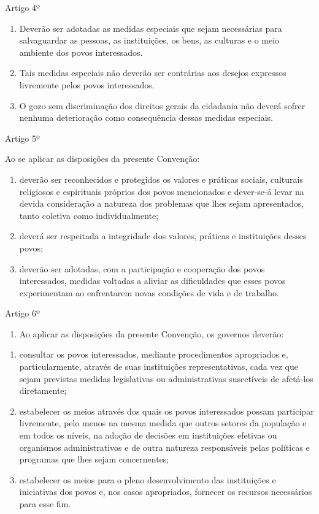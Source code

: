 \documentclass[
]{book}
\providecommand{\tightlist}{%
  \setlength{\itemsep}{0pt}\setlength{\parskip}{0pt}}
\begin{document}
Artigo 4º

\begin{enumerate}
\def\labelenumi{\arabic{enumi}.}
\item
  Deverão ser adotadas as medidas especiais que sejam necessárias para salvaguardar as pessoas, as instituições, os bens, as culturas e o meio ambiente dos povos interessados.
\item
  Tais medidas especiais não deverão ser contrárias aos desejos expressos livremente pelos povos interessados.
\item
  O gozo sem discriminação dos direitos gerais da cidadania não deverá sofrer nenhuma deterioração como consequência dessas medidas especiais.
\end{enumerate}

Artigo 5º

Ao se aplicar as disposições da presente Convenção:

\begin{enumerate}
\def\labelenumi{\alph{enumi})}
\item
  deverão ser reconhecidos e protegidos os valores e práticas sociais, culturais religiosos e espirituais próprios dos povos mencionados e dever-se-á levar na devida consideração a natureza dos problemas que lhes sejam apresentados, tanto coletiva como individualmente;
\item
  deverá ser respeitada a integridade dos valores, práticas e instituições desses povos;
\item
  deverão ser adotadas, com a participação e cooperação dos povos interessados, medidas voltadas a aliviar as dificuldades que esses povos experimentam ao enfrentarem novas condições de vida e de trabalho.
\end{enumerate}

Artigo 6º

\begin{enumerate}
\def\labelenumi{\arabic{enumi}.}
\tightlist
\item
  Ao aplicar as disposições da presente Convenção, os governos deverão:
\end{enumerate}

\begin{enumerate}
\def\labelenumi{\alph{enumi})}
\item
  consultar os povos interessados, mediante procedimentos apropriados e, particularmente, através de suas instituições representativas, cada vez que sejam previstas medidas legislativas ou administrativas suscetíveis de afetá-los diretamente;
\item
  estabelecer os meios através dos quais os povos interessados possam participar livremente, pelo menos na mesma medida que outros setores da população e em todos os níveis, na adoção de decisões em instituições efetivas ou organismos administrativos e de outra natureza responsáveis pelas políticas e programas que lhes sejam concernentes;
\item
  estabelecer os meios para o pleno desenvolvimento das instituições e iniciativas dos povos e, nos casos apropriados, fornecer os recursos necessários para esse fim.
\end{enumerate}
\end{document}
